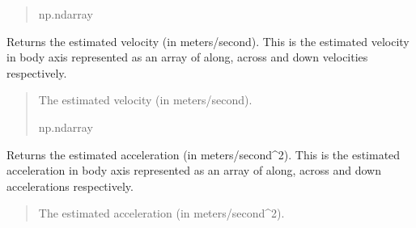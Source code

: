 \documentclass[letterpaper,10pt,english]{sphinxmanual}
\begin{document}
\begin{fulllineitems}
\begin{fulllineitems}
\begin{quote}
\begin{description}
\sphinxAtStartPar
np.ndarray

\end{description}\end{quote}

\end{fulllineitems}


\begin{fulllineitems}
\label{\detokenize{modules/estimation/state:qnav.estimation.state.EstimatedState.velocity}}
\pysigstartsignatures
{}
\pysigstopsignatures
\sphinxAtStartPar
Returns the estimated velocity (in meters/second).
This is the estimated velocity in body axis represented as an array
of along, across and down velocities respectively.
\begin{quote}\begin{description}
\sphinxAtStartPar
The estimated velocity (in meters/second).

\sphinxAtStartPar
np.ndarray

\end{description}\end{quote}

\end{fulllineitems}


\begin{fulllineitems}
\label{\detokenize{modules/estimation/state:qnav.estimation.state.EstimatedState.acceleration}}
\pysigstartsignatures
{}
\pysigstopsignatures
\sphinxAtStartPar
Returns the estimated acceleration (in meters/second\textasciicircum{}2).
This is the estimated acceleration in body axis represented as an
array of along, across and down accelerations respectively.
\begin{quote}\begin{description}
\sphinxAtStartPar
The estimated acceleration (in meters/second\textasciicircum{}2).


\end{description}
\end{quote}
\end{fulllineitems}
\end{fulllineitems}
\end{document}
